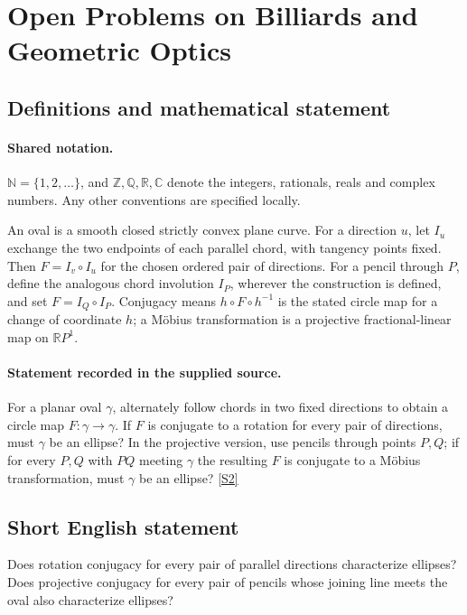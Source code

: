 \documentclass[11pt]{article}
\newcommand{\sref}[2]{\hyperlink{source:#1:#2}{[S#2]}}
\begin{document}
\section{Open Problems on Billiards and Geometric Optics}\label{statement}

\subsection{Definitions and mathematical statement}

\paragraph{Shared notation.}$\mathbb N=\{1,2,\ldots\}$, and $\mathbb Z,\mathbb Q,\mathbb R,\mathbb C$ denote the integers, rationals, reals and complex numbers. Any other conventions are specified locally.


An oval is a smooth closed strictly convex plane curve. For a direction $u$, let $I_u$ exchange the two endpoints of each parallel chord, with tangency points fixed. Then $F=I_v\circ I_u$ for the chosen ordered pair of directions. For a pencil through $P$, define the analogous chord involution $I_P$, wherever the construction is defined, and set $F=I_Q\circ I_P$. Conjugacy means $h\circ F\circ h^{-1}$ is the stated circle map for a change of coordinate $h$; a M\"obius transformation is a projective fractional-linear map on $\mathbb RP^1$.
\paragraph{Statement recorded in the supplied source.}
For a planar oval $\gamma$, alternately follow chords in two fixed directions to obtain a circle map $F:\gamma\to\gamma$. If $F$ is conjugate to a rotation for every pair of directions, must $\gamma$ be an ellipse? In the projective version, use pencils through points $P,Q$; if for every $P,Q$ with $PQ$ meeting $\gamma$ the resulting $F$ is conjugate to a Möbius transformation, must $\gamma$ be an ellipse? \sref{statement}{2}
\subsection{Short English statement}
Does rotation conjugacy for every pair of parallel directions characterize ellipses? Does projective conjugacy for every pair of pencils whose joining line meets the oval also characterize ellipses?
\end{document}
